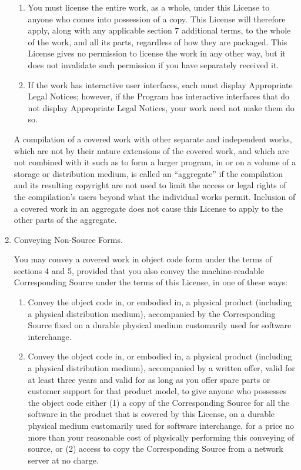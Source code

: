 \documentclass[11pt,twoside,fleqn,openright,titlepage]{cslreport}
\begin{document}
\begin{small}
\begin{enumerate}
\begin{enumerate}
  \item You must license the entire work, as a whole, under this
  License to anyone who comes into possession of a copy.  This
  License will therefore apply, along with any applicable section 7
  additional terms, to the whole of the work, and all its parts,
  regardless of how they are packaged.  This License gives no
  permission to license the work in any other way, but it does not
  invalidate such permission if you have separately received it.

  \item If the work has interactive user interfaces, each must display
  Appropriate Legal Notices; however, if the Program has interactive
  interfaces that do not display Appropriate Legal Notices, your
  work need not make them do so.
\end{enumerate}
A compilation of a covered work with other separate and independent
works, which are not by their nature extensions of the covered work,
and which are not combined with it such as to form a larger program,
in or on a volume of a storage or distribution medium, is called an
``aggregate'' if the compilation and its resulting copyright are not
used to limit the access or legal rights of the compilation's users
beyond what the individual works permit.  Inclusion of a covered work
in an aggregate does not cause this License to apply to the other
parts of the aggregate.

\item Conveying Non-Source Forms.

You may convey a covered work in object code form under the terms
of sections 4 and 5, provided that you also convey the
machine-readable Corresponding Source under the terms of this License,
in one of these ways:
  \begin{enumerate}
  \item Convey the object code in, or embodied in, a physical product
  (including a physical distribution medium), accompanied by the
  Corresponding Source fixed on a durable physical medium
  customarily used for software interchange.

  \item Convey the object code in, or embodied in, a physical product
  (including a physical distribution medium), accompanied by a
  written offer, valid for at least three years and valid for as
  long as you offer spare parts or customer support for that product
  model, to give anyone who possesses the object code either (1) a
  copy of the Corresponding Source for all the software in the
  product that is covered by this License, on a durable physical
  medium customarily used for software interchange, for a price no
  more than your reasonable cost of physically performing this
  conveying of source, or (2) access to copy the
  Corresponding Source from a network server at no charge.


\end{enumerate}
\end{enumerate}
\end{small}
\end{document}
